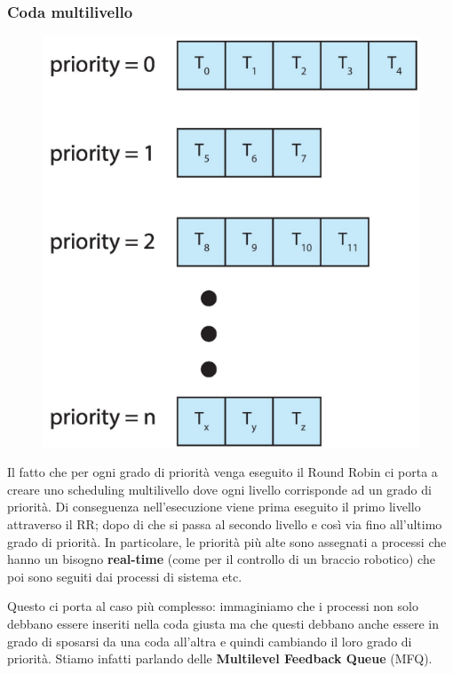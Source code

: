 \subsubsection{Coda multilivello}
\begin{figure}
  \includegraphics[width = \linewidth]{../res/imgs/CPU scheduling/multilevel_scheduling.png}
  \label{fig:multilevel_scheduling}
\end{figure}
Il fatto che per ogni grado di priorità venga eseguito il Round Robin ci porta a creare uno scheduling multilivello dove ogni livello corrisponde ad un grado di priorità. Di conseguenza nell'esecuzione viene prima eseguito il primo livello attraverso il RR; dopo di che si passa al secondo livello e così via fino all'ultimo grado di priorità. In particolare, le priorità più alte sono assegnati a processi che hanno un bisogno \textbf{real-time} (come per il controllo di un braccio robotico) che poi sono seguiti dai processi di sistema etc.

Questo ci porta al caso più complesso: immaginiamo che i processi non solo debbano essere inseriti nella coda giusta ma che questi debbano anche essere in grado di sposarsi da una coda all'altra e quindi cambiando il loro grado di priorità. Stiamo infatti parlando delle \textbf{Multilevel Feedback Queue} (MFQ).


